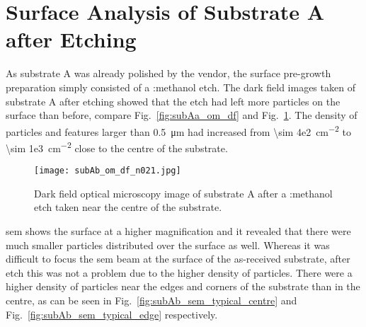 \clearpage
%
%
    
\section{Surface Analysis of Substrate A after Etching}
As substrate A was already polished by the vendor, the surface pre-growth preparation simply consisted of a :methanol etch. The dark field images taken of substrate A after etching showed that the etch had left more particles on the surface than before, compare Fig.~\ref{fig:subAa_om_df} and Fig.~\ref{fig:subAb_om_df}. The density of particles and features larger than \SI{0.5}{\micro\metre} had increased from \SI{\sim 4e2}{\centi\metre^{-2}} to \SI{\sim 1e3}{\centi\metre^{-2}} close to the centre of the substrate. %

\begin{figure}[htbp]
    \centering
    \texttt{[image: subAb\_om\_df\_n021.jpg]}
    \caption[Dark field optical microscopy image of substrate A after a :methanol etch.]{Dark field optical microscopy image of substrate A after a :methanol etch taken near the centre of the substrate.}\label{fig:subAb_om_df}
\end{figure}

\Ac{sem} shows the surface at a higher magnification and it revealed that there were much smaller particles distributed over the surface as well. Whereas it was difficult to focus the \ac{sem} beam at the surface of the as-received substrate, after etch this was not a problem due to the higher density of particles. There were a higher density of particles near the edges and corners of the substrate than in the centre, as can be seen in Fig.~\ref{fig:subAb_sem_typical_centre} and Fig.~\ref{fig:subAb_sem_typical_edge} respectively.

